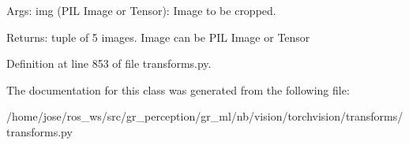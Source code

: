 \begin{DoxyVerb}Args:
    img (PIL Image or Tensor): Image to be cropped.

Returns:
    tuple of 5 images. Image can be PIL Image or Tensor
\end{DoxyVerb}
 

Definition at line 853 of file transforms.\+py.



The documentation for this class was generated from the following file\+:\begin{DoxyCompactItemize}
\item 
/home/jose/ros\+\_\+ws/src/gr\+\_\+perception/gr\+\_\+ml/nb/vision/torchvision/transforms/transforms.\+py\end{DoxyCompactItemize}
